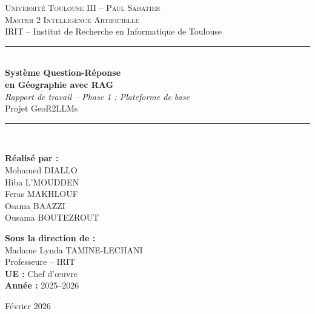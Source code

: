\documentclass[12pt,a4paper]{article}
\begin{document}
\begin{titlepage}
  \centering
  \vspace*{1cm}

  {\Large\textsc{Université Toulouse III -- Paul Sabatier}}\\[0.3cm]
  {\large\textsc{Master 2 Intelligence Artificielle}}\\[0.2cm]
  {\normalsize IRIT -- Institut de Recherche en Informatique de Toulouse}\\[2cm]

  \rule{\textwidth}{1.5pt}\\[0.6cm]
  {\huge\bfseries Système Question-Réponse\\[0.3cm] en Géographie avec RAG}\\[0.4cm]
  {\Large\textit{Rapport de travail -- Phase 1 : Plateforme de base}}\\[0.3cm]
  {\large Projet GeoR2LLMs}\\[0.4cm]
  \rule{\textwidth}{1.5pt}\\[2cm]

  \begin{minipage}{0.45\textwidth}
    \begin{flushleft}
      \textbf{Réalisé par :}\\[0.3cm]
      Mohamed DIALLO\\
      Hiba L'MOUDDEN\\
      Feras MAKHLOUF\\
      Osama BAAZZI\\
      Ousama BOUTEZROUT
    \end{flushleft}
  \end{minipage}
  \hfill
  \begin{minipage}{0.45\textwidth}
    \begin{flushright}
      \textbf{Sous la direction de :}\\[0.3cm]
      Madame Lynda TAMINE-LECHANI\\
      Professeure -- IRIT\\[0.5cm]
      \textbf{UE :} Chef d'\oe uvre\\
      \textbf{Année :} 2025--2026
    \end{flushright}
  \end{minipage}

  \vfill

  {\large Février 2026}
\end{titlepage}
\end{document}
